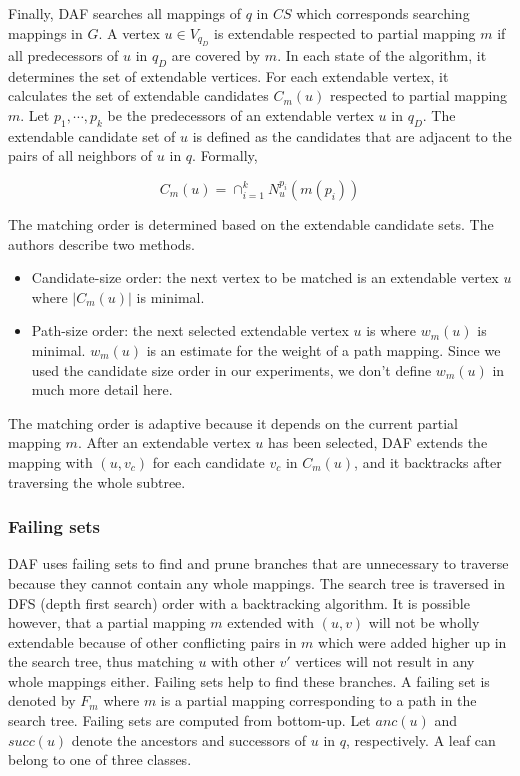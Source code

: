 Finally, DAF searches all mappings of $q$ in $CS$ which corresponds searching mappings in $G$. A vertex $u \in V_{q_D}$
is extendable respected to partial mapping $m$ if all predecessors of $u$ in $q_D$ are covered by $m$. In each state
of the algorithm, it determines the set of extendable vertices. For each extendable vertex, it calculates the set of
extendable candidates $C_m(u)$ respected to partial mapping $m$. Let $p_1, \cdots, p_k$ be the predecessors of an
extendable vertex $u$ in $q_D$. The extendable candidate set of $u$ is defined as the candidates that are adjacent to
the pairs of all neighbors of $u$ in $q$. Formally,

\[ C_m(u) = \cap^k_{i=1} N^{p_i}_u(m(p_i)) \]

The matching order is determined based on the extendable candidate sets. The authors describe two methods.
\begin{itemize}
    \item Candidate-size order: the next vertex to be matched is an extendable vertex $u$ where $|C_m(u)|$ is minimal.
    \item Path-size order: the next selected extendable vertex $u$ is where $w_m(u)$ is minimal. $w_m(u)$ is an estimate for the weight of a path mapping. Since we used the candidate size order in our experiments, we don't define $w_m(u)$ in much more detail here.
\end{itemize}

The matching order is adaptive because it depends on the current partial mapping $m$. After an extendable vertex $u$
has been selected, DAF extends the mapping with $(u, v_c)$ for each candidate $v_c$ in $C_m(u)$, and it backtracks
after traversing the whole subtree.

\subsubsection{Failing sets}

DAF uses failing sets to find and prune branches that are unnecessary to traverse because they cannot contain any
whole mappings. The search tree is traversed in DFS (depth first search) order with a backtracking algorithm. It
is possible however, that a partial mapping $m$ extended with $(u, v)$ will not be wholly extendable because of
other conflicting pairs in $m$ which were added higher up in the search tree, thus matching $u$ with other $v'$
vertices will not result in any whole mappings either. Failing sets help to find these branches. A failing set is
denoted by $F_m$ where $m$ is a partial mapping corresponding to a path in the search tree. Failing sets are computed
from bottom-up. Let $anc(u)$ and $succ(u)$ denote the ancestors and successors of $u$ in $q$, respectively. A leaf can 
belong to one of three classes.

